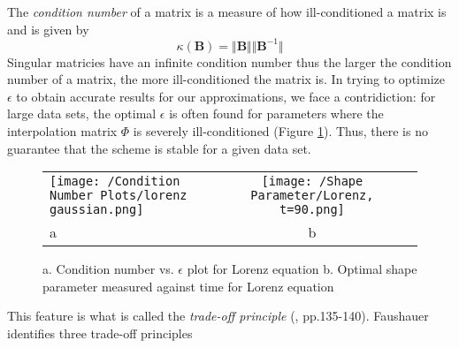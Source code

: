                 The \textit{condition number} of a matrix is a measure of how ill-conditioned a matrix is and is given by
                \begin{equation}
                    \kappa(\mathbf{B})=\Vert\mathbf{B}\Vert\Vert\mathbf{B}^{-1}\Vert
                \end{equation}
                Singular matricies have an infinite condition number thus the larger the %
                condition number of a matrix, the more ill-conditioned the matrix is. In trying to optimize $\epsilon$
                to obtain accurate results for our approximations, we face a contridiction: for large data sets, the optimal
                $\epsilon$ is often found for parameters where the interpolation matrix $\Phi$ is severely ill-conditioned (Figure \ref{fig:cond}).
                Thus, there is no guarantee that the scheme is stable for a given data set.
                \begin{figure}[h]
                    \centering
                    \begin{tabular}{lcc}
                        \texttt{[image: /Condition Number Plots/lorenz gaussian.png]}&
                        \texttt{[image: /Shape Parameter/Lorenz, t=90.png]}\\
                        \hfil a & b\\
                    \end{tabular}
                    \caption{a. Condition number vs. $\epsilon$ plot for Lorenz equation
                            b. Optimal shape parameter measured against time for Lorenz equation}\label{fig:cond}
                \end{figure}
                This feature is what is called the \textit{trade-off principle} (\cite{item:1}, pp.135-140). Faushauer identifies
                three trade-off principles
